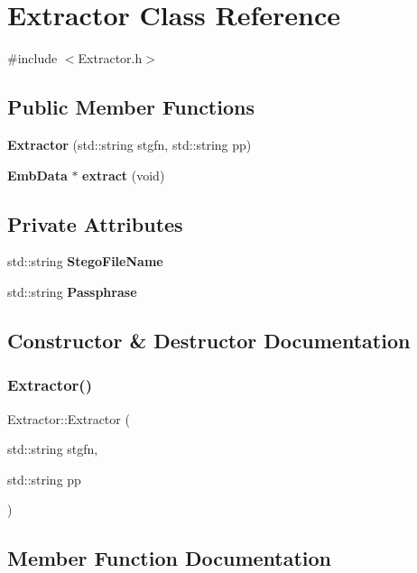 \section{Extractor Class Reference}
\label{classExtractor}


{\ttfamily \#include $<$Extractor.\+h$>$}

\subsection*{Public Member Functions}
\begin{DoxyCompactItemize}
\item 
\textbf{ Extractor} (std\+::string stgfn, std\+::string pp)
\item 
\textbf{ Emb\+Data} $\ast$ \textbf{ extract} (void)
\end{DoxyCompactItemize}
\subsection*{Private Attributes}
\begin{DoxyCompactItemize}
\item 
std\+::string \textbf{ Stego\+File\+Name}
\item 
std\+::string \textbf{ Passphrase}
\end{DoxyCompactItemize}


\subsection{Constructor \& Destructor Documentation}
\mbox{\label{classExtractor_a2fee5b31407411c1824bd230389c06fa}} 
\subsubsection{Extractor()}
{\footnotesize\ttfamily Extractor\+::\+Extractor (\begin{DoxyParamCaption}\item[{std\+::string}]{stgfn,  }\item[{std\+::string}]{pp }\end{DoxyParamCaption})\hspace{0.3cm}{\ttfamily [inline]}}



\subsection{Member Function Documentation}
\mbox{\label{classExtractor_abae75f3b73c31852d4eda4621b7348b2}} 
